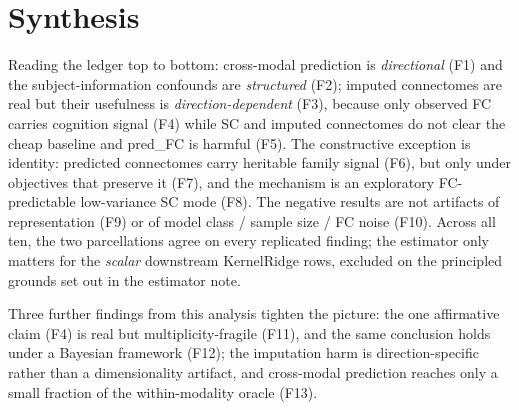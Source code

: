 \documentclass{article}
\begin{document}
\FloatBarrier
\section*{Synthesis}
Reading the ledger top to bottom: cross-modal prediction is \emph{directional} (F1) and the
subject-information confounds are \emph{structured} (F2); imputed connectomes are real but their
usefulness is \emph{direction-dependent} (F3), because only observed FC carries cognition signal
(F4) while SC and imputed connectomes do not clear the cheap baseline and pred\_FC is harmful
(F5). The constructive exception is identity: predicted connectomes carry heritable family
signal (F6), but only under objectives that preserve it (F7), and the mechanism is an
exploratory FC-predictable low-variance SC mode (F8). The negative results are not artifacts of
representation (F9) or of model class / sample size / FC noise (F10). Across all ten, the two
parcellations agree on every replicated finding; the estimator only matters for the
\emph{scalar} downstream KernelRidge rows, excluded on the principled grounds set out in the
estimator note.

Three further findings from this analysis tighten the picture: the one affirmative claim (F4)
is real but multiplicity-fragile (F11), and the same conclusion holds under a Bayesian
framework (F12); the imputation harm is direction-specific rather than a dimensionality
artifact, and cross-modal prediction reaches only a small fraction of the within-modality
oracle (F13).
\end{document}
